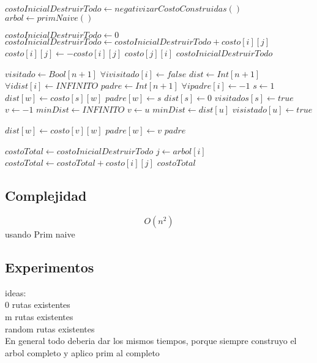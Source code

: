 \begin{algorithm}
\label{ej3}         %
\begin{algorithmic}
	\State $costoInicialDestruirTodo \gets negativizarCostoConstruidas()$
	\State $arbol \gets primNaive()$
	\State \Return {}
\EndFunction

	\State $costoInicialDestruirTodo \gets 0$
	\For{$i \in [0..n)$}
				\State $costoInicialDestruirTodo \gets costoInicialDestruirTodo + costo[i][j]$
				\State $costo[i][j] \gets -costo[i][j]$
				\State $costo[j][i]$
			\EndIf
		\EndFor
	\EndFor
	\State \Return $costoInicialDestruirTodo$
\EndFunction

	\State $visitado \gets Bool[n+1]$
	\State $\forall i visitado[i] \gets false$
	\State $dist \gets Int[n+1]$
	\State $\forall i dist[i] \gets INFINITO$	
	\State $padre \gets Int[n+1]$
	\State $\forall i padre[i] \gets -1$
	\State $s \gets 1$
			\State $dist[w] \gets costo[s][w]$
			\State $padre[w] \gets s$
		\EndIf
	\EndFor
	\State $dist[s] \gets 0$
	\State $visitados[s] \gets true$
		\State $v \gets -1$
		\State $minDist \gets INFINITO$
				\State $v \gets u$
				\State $minDist \gets dist[u]$
			\EndIf
		\EndFor
		\State $visistado[u] \gets true$
		
				\State $dist[w] \gets costo[v][w]$			
				\State $padre[w] \gets v$
			\EndIf
		\EndFor
	\EndFor
	\State \Return $padre$
\EndFunction

	\State $costoTotal \gets costoInicialDestruirTodo$
		\State $j \gets arbol[i]$
		\State $costoTotal \gets costoTotal + costo[i][j]$
	\EndFor
	\State \Return $costoTotal$
\EndFunction
\end{algorithmic}
\end{algorithm}

\newpage
\subsection{Complejidad}

$$O(n^2)$$ usando Prim naive


\subsection{Experimentos}

ideas:\\
0 rutas existentes\\
m rutas existentes\\
random rutas existentes\\

En general todo deberia dar los mismos tiempos, porque siempre construyo el arbol completo y aplico prim al completo